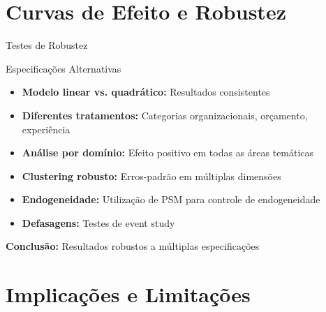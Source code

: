 \documentclass[aspectratio=169]{beamer}
\begin{document}

\section{Curvas de Efeito e Robustez}

\begin{frame}{Testes de Robustez}
\begin{block}{Especificações Alternativas}
\begin{itemize}
\item \textbf{Modelo linear vs. quadrático:} Resultados consistentes
\item \textbf{Diferentes tratamentos:} Categorias organizacionais, orçamento, experiência
\item \textbf{Análise por domínio:} Efeito positivo em todas as áreas temáticas
\item \textbf{Clustering robusto:} Erros-padrão em múltiplas dimensões
\item \textbf{Endogeneidade:} Utilização de PSM para controle de endogeneidade
\item \textbf{Defasagens:} Testes de event study
\end{itemize}
\end{block}

\vspace{0.3cm}

\textbf{Conclusão:} Resultados robustos a múltiplas especificações
\end{frame}


\section{Implicações e Limitações}
\end{document}
